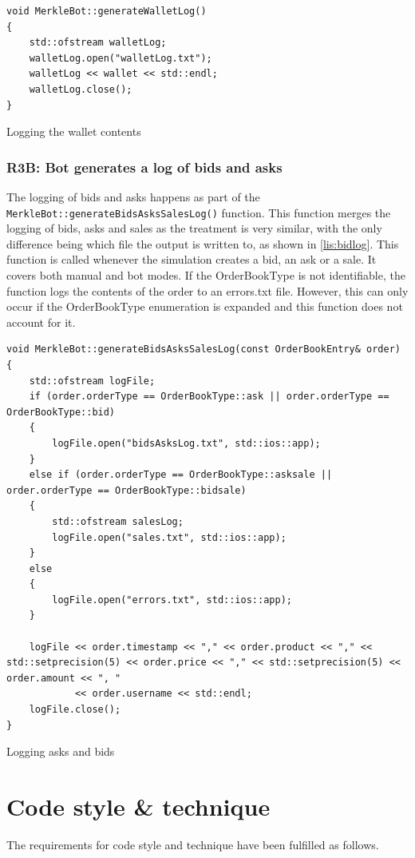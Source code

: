 \begin{listing}[H]
	\begin{verbatim}
void MerkleBot::generateWalletLog()
{
	std::ofstream walletLog;
	walletLog.open("walletLog.txt");
	walletLog << wallet << std::endl;
	walletLog.close();
}
	\end{verbatim}

	\caption{Logging the wallet contents}
	\label{lis:walletlog}
\end{listing}

\subsubsection{R3B: Bot generates a log of bids and asks}
The logging of bids and asks happens as part of the \texttt{MerkleBot::generateBidsAsksSalesLog()} function. This function merges the logging of bids, asks and sales as the treatment is very similar, with the only difference being which file the output is written to, as shown in \autoref{lis:bidlog}. This function is called whenever the simulation creates a bid, an ask or a sale. It covers both manual and bot modes. If the OrderBookType is not identifiable, the function logs the contents of the order to an errors.txt file. However, this can only occur if the OrderBookType enumeration is expanded and this function does not account for it.

\begin{listing}[H]
	\begin{verbatim}
void MerkleBot::generateBidsAsksSalesLog(const OrderBookEntry& order)
{
	std::ofstream logFile;
	if (order.orderType == OrderBookType::ask || order.orderType == OrderBookType::bid)
	{
		logFile.open("bidsAsksLog.txt", std::ios::app);
	}
	else if (order.orderType == OrderBookType::asksale || order.orderType == OrderBookType::bidsale)
	{
		std::ofstream salesLog;
		logFile.open("sales.txt", std::ios::app);
	}
	else
	{
		logFile.open("errors.txt", std::ios::app);
	}

	logFile << order.timestamp << "," << order.product << "," << std::setprecision(5) << order.price << "," << std::setprecision(5) << order.amount << ", "
			<< order.username << std::endl;
	logFile.close();
}
	\end{verbatim}

	\caption{Logging asks and bids}
	\label{lis:bidlog}
\end{listing}


\section{Code style \& technique}
The requirements for code style and technique have been fulfilled as follows.

